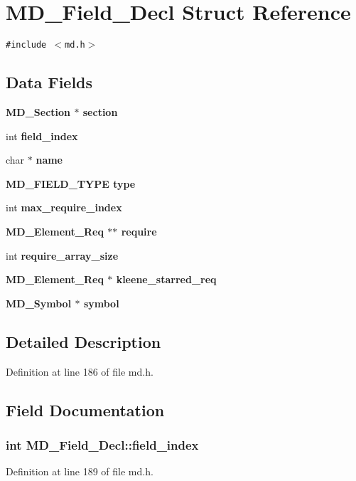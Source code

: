 \section{MD\_\-Field\_\-Decl Struct Reference}
\label{structMD__Field__Decl}
{\tt \#include $<$md.h$>$}

\subsection*{Data Fields}
\begin{CompactItemize}
\item 
\bf{MD\_\-Section} $\ast$ \bf{section}
\item 
int \bf{field\_\-index}
\item 
char $\ast$ \bf{name}
\item 
\bf{MD\_\-FIELD\_\-TYPE} \bf{type}
\item 
int \bf{max\_\-require\_\-index}
\item 
\bf{MD\_\-Element\_\-Req} $\ast$$\ast$ \bf{require}
\item 
int \bf{require\_\-array\_\-size}
\item 
\bf{MD\_\-Element\_\-Req} $\ast$ \bf{kleene\_\-starred\_\-req}
\item 
\bf{MD\_\-Symbol} $\ast$ \bf{symbol}
\end{CompactItemize}


\subsection{Detailed Description}




Definition at line 186 of file md.h.

\subsection{Field Documentation}
\subsubsection{\setlength{\rightskip}{0pt plus 5cm}int \bf{MD\_\-Field\_\-Decl::field\_\-index}}\label{structMD__Field__Decl_798c389b6107ada7531d02e1b4ad2a4a}




Definition at line 189 of file md.h.

